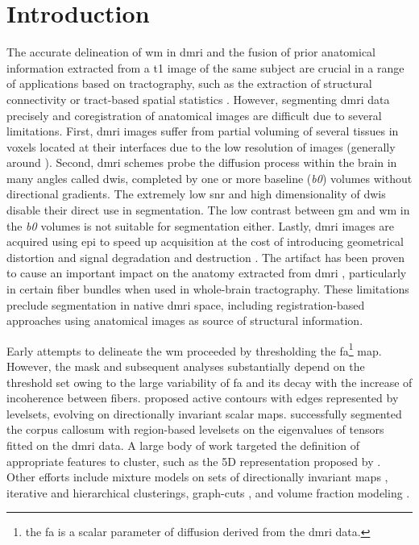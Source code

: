 \section{Introduction}\label{sec:introduction}
The accurate delineation of \gls*{wm} in \gls*{dmri} and the fusion of prior
  anatomical information extracted from a \gls*{t1} image of the same subject
  are crucial in a range of applications based on tractography, such as
  the extraction of structural connectivity \citep{craddock_imaging_2013} or
  tract-based spatial statistics \citep{smith_tractbased_2006}.
However, segmenting \gls*{dmri} data precisely and coregistration of anatomical
  images are difficult due to several limitations.
First, \gls{dmri} images suffer from partial voluming of several tissues in 
  voxels located at their interfaces due to the low resolution of images
  (generally around ).
Second, \gls*{dmri} schemes probe the diffusion process within the brain in 
  many angles called \glspl*{dwi}, completed by one or more baseline (\emph{b0}) 
  volumes without directional gradients.
The extremely low \gls*{snr} and high dimensionality of \glspl*{dwi} disable their
  direct use in segmentation.
The low contrast between \gls*{gm} and \gls*{wm} in the \emph{b0} volumes is not suitable for 
  segmentation either.
Lastly, \gls*{dmri} images are acquired using \gls*{epi} to speed up acquisition
  at the cost of introducing geometrical distortion and signal degradation and
  destruction \citep{jezzard_correction_1995}.
The artifact has been proven to cause an important impact on the anatomy extracted
  from \gls*{dmri} \citep{irfanoglu_effects_2012}, particularly in certain fiber bundles
  when used in whole-brain tractography.
These limitations preclude segmentation in native \gls*{dmri} space, including
  registration-based approaches using anatomical images as source of structural
  information.


Early attempts to delineate the \gls*{wm} proceeded by thresholding the 
  \gls*{fa}\footnote{the \gls*{fa} is a scalar parameter of diffusion derived from
  the \gls*{dmri} data.} map.
However, the mask and subsequent analyses substantially depend on the threshold set
  \citep{taoka_fractional_2009} owing to the large variability of \gls*{fa} and its
  decay with the increase of incoherence between fibers.
\cite{zhukov_level_2003} proposed active contours with edges represented
  by levelsets, evolving on directionally invariant scalar maps.
\cite{rousson_level_2004} successfully segmented the corpus callosum with
  region-based levelsets on the eigenvalues of tensors fitted on the
  \gls*{dmri} data.
A large body of work targeted the definition of appropriate features to cluster,
  such as the 5D representation proposed by \cite{jonasson_segmentation_2005}.
Other efforts include mixture models on sets of directionally invariant maps
  \citep{liu_brain_2007}, iterative \citep{hadjiprocopis_unbiased_2005} and
  hierarchical \citep{lu_segmentation_2008} clusterings,
  graph-cuts \citep{han_experimental_2009},
  and volume fraction modeling \citep{kumazawa_improvement_2013}.
 
